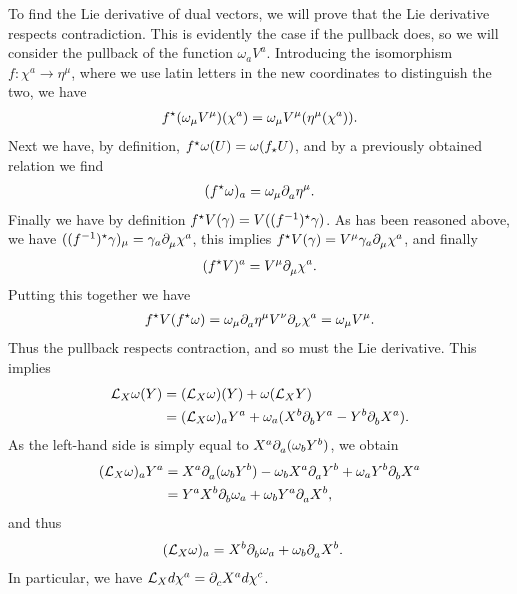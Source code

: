 To find the Lie derivative of dual vectors, we will prove that the Lie derivative respects contradiction. This is evidently the case if the pullback does, so we will consider the pullback of the function $\omega_{a}V^{a}$. Introducing the isomorphism $f: \chi^{a}\to\eta^{\mu}$, where we use latin letters in the new coordinates to distinguish the two, we have
\begin{align*}
	f^{\star}(\omega_{\mu}V^{\mu})(\chi^{a}) = \omega_{\mu}V^{\mu}(\eta^{\mu}(\chi^{a})).
\end{align*}
Next we have, by definition, $f^{\star}\omega(U) = \omega(f_{\star}U)$, and by a previously obtained relation we find
\begin{align*}
	(f^{\star}\omega)_{a} = \omega_{\mu}\partial^{}_{a}{\eta^{\mu}}.
\end{align*}
Finally we have by definition $f^{\star}V(\gamma) = V((f^{-1})^{\star}\gamma)$. As has been reasoned above, we have $((f^{-1})^{\star}\gamma)_{\mu} = \gamma_{a}\partial^{}_{\mu}{\chi^{a}}$, this implies $f^{\star}V(\gamma) = V^{\mu}\gamma_{a}\partial^{}_{\mu}{\chi^{a}}$, and finally
\begin{align*}
	(f^{\star}V)^{a} = V^{\mu}\partial^{}_{\mu}{\chi^{a}}.
\end{align*}
Putting this together we have
\begin{align*}
	f^{\star}V(f^{\star}\omega) = \omega_{\mu}\partial^{}_{a}{\eta^{\mu}}V^{\nu}\partial^{}_{\nu}{\chi^{a}} = \omega_{\mu}V^{\mu}.
\end{align*}
Thus the pullback respects contraction, and so must the Lie derivative. This implies
\begin{align*}
	\mathcal{L}_{X}\omega(Y) &= (\mathcal{L}_{X}\omega)(Y) + \omega(\mathcal{L}_{X}Y) \\
	                    &= (\mathcal{L}_{X}\omega)_{a}Y^{a} + \omega_{a}(X^{b}\partial^{}_{b}{Y^{a}} - Y^{b}\partial^{}_{b}{X^{a}}).
\end{align*}
As the left-hand side is simply equal to $X^{a}\partial^{}_{a}{(\omega_{b}Y^{b})}$, we obtain
\begin{align*}
	(\mathcal{L}_{X}\omega)_{a}Y^{a} &= X^{a}\partial^{}_{a}{(\omega_{b}Y^{b})} - \omega_{b}X^{a}\partial^{}_{a}{Y^{b}} + \omega_{a}Y^{b}\partial^{}_{b}{X^{a}} \\
&= Y^{a}X^{b}\partial^{}_{b}{\omega_{a}} + \omega_{b}Y^{a}\partial^{}_{a}{X^{b}},
\end{align*}
and thus
\begin{align*}
	(\mathcal{L}_{X}\omega)_{a} &= X^{b}\partial^{}_{b}{\omega_{a}} + \omega_{b}\partial^{}_{a}{X^{b}}.
\end{align*}
In particular, we have $\mathcal{L}_{X}d\chi^{a} = \partial^{}_{c}{X^{a}}d\chi^{c}$.


